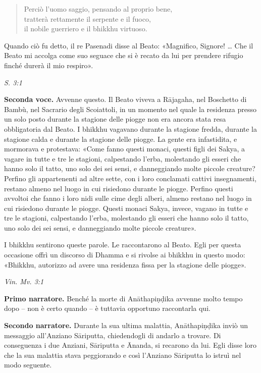 \begin{quotation}
Perciò l’uomo saggio, pensando al proprio bene, \\
tratterà rettamente il serpente e il fuoco, \\
il nobile guerriero e il bhikkhu virtuoso.
\end{quotation}

Quando ciò fu detto, il re Pasenadi disse al Beato: «Magnifico, Signore!
…​ Che il Beato mi accolga come suo seguace che si è recato da lui per
prendere rifugio finché durerà il mio respiro».


\emph{S. 3:1}


\textbf{Seconda voce.} Avvenne questo. Il Beato viveva a Rājagaha, nel Boschetto
di Bambù, nel Sacrario degli Scoiattoli, in un momento nel quale la
residenza presso un solo posto durante la stagione delle piogge non era
ancora stata resa obbligatoria dal Beato. I bhikkhu vagavano durante la
stagione fredda, durante la stagione calda e durante la stagione delle
piogge. La gente era infastidita, e mormorava e protestava: «Come fanno
questi monaci, questi figli dei Sakya, a vagare in tutte e tre le
stagioni, calpestando l’erba, molestando gli esseri che hanno solo il
tatto, uno solo dei sei sensi, e danneggiando molte piccole creature?
Perfino gli appartenenti ad altre sette, con i loro conclamati cattivi
insegnamenti, restano almeno nel luogo in cui risiedono durante le
piogge. Perfino questi avvoltoi che fanno i loro nidi sulle cime degli
alberi, almeno restano nel luogo in cui risiedono durante le piogge.
Questi monaci Sakya, invece, vagano in tutte e tre le stagioni,
calpestando l’erba, molestando gli esseri che hanno solo il tatto, uno
solo dei sei sensi, e danneggiando molte piccole creature».


I bhikkhu sentirono queste parole. Le raccontarono al Beato. Egli per
questa occasione offrì un discorso di Dhamma e si rivolse ai bhikkhu in
questo modo: «Bhikkhu, autorizzo ad avere una residenza fissa per la
stagione delle piogge».


\emph{Vin. Mv. 3:1}


\textbf{Primo narratore.} Benché la morte di Anāthapiṇḍika avvenne molto tempo
dopo – non è certo quando – è tuttavia opportuno raccontarla qui.


\textbf{Secondo narratore.} Durante la sua ultima malattia, Anāthapiṇḍika inviò
un messaggio all’Anziano Sāriputta, chiedendogli di andarlo a trovare.
Di conseguenza i due Anziani, Sāriputta e Ānanda, si recarono da lui.
Egli disse loro che la sua malattia stava peggiorando e così l’Anziano
Sāriputta lo istruì nel modo seguente.



